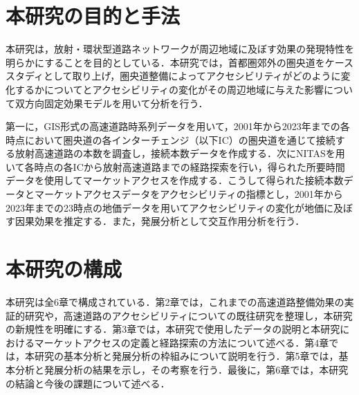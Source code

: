 \section{本研究の目的と手法}

本研究は，放射・環状型道路ネットワークが周辺地域に及ぼす効果の発現特性を明らかにすることを目的としている．本研究では，首都圏郊外の圏央道をケーススタディとして取り上げ，圏央道整備によってアクセシビリティがどのように変化するかについてとアクセシビリティの変化がその周辺地域に与えた影響について双方向固定効果モデルを用いて分析を行う．

第一に，GIS形式の高速道路時系列データを用いて，2001年から2023年までの各時点において圏央道の各インターチェンジ（以下IC）の圏央道を通じて接続する放射高速道路の本数を調査し，接続本数データを作成する．次にNITASを用いて各時点の各ICから放射高速道路までの経路探索を行い，得られた所要時間データを使用してマーケットアクセスを作成する．こうして得られた接続本数データとマーケットアクセスデータをアクセシビリティの指標とし，2001年から2023年までの23時点の地価データを用いてアクセシビリティの変化が地価に及ぼす因果効果を推定する．また，発展分析として交互作用分析を行う．

\section{本研究の構成}

本研究は全6章で構成されている．第2章では，これまでの高速道路整備効果の実証的研究や，高速道路のアクセシビリティについての既往研究を整理し，本研究の新規性を明確にする．第3章では，本研究で使用したデータの説明と本研究におけるマーケットアクセスの定義と経路探索の方法について述べる．第4章では，本研究の基本分析と発展分析の枠組みについて説明を行う．第5章では，基本分析と発展分析の結果を示し，その考察を行う．最後に，第6章では，本研究の結論と今後の課題について述べる．

